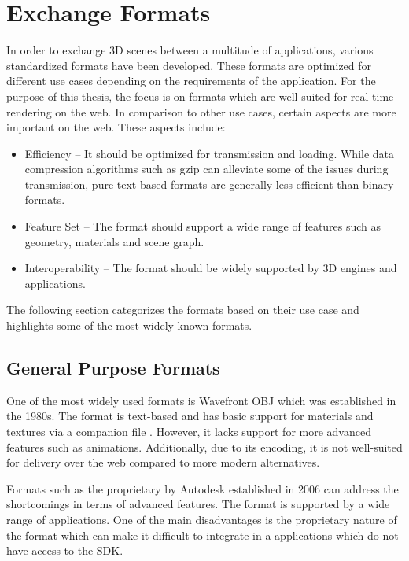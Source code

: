 \section{Exchange Formats}

In order to exchange 3D scenes between a multitude of applications, various standardized formats have been developed. These formats are optimized for different use cases depending on the requirements of the application. For the purpose of this thesis, the focus is on formats which are well-suited for real-time rendering on the web. In comparison to other use cases, certain aspects are more important on the web. These aspects include:

\begin{itemize}
    \item{Efficiency} – It should be optimized for transmission and loading. While data compression algorithms such as gzip can alleviate some of the issues during transmission, pure text-based formats are generally less efficient than binary formats.
    \item{Feature Set} – The format should support a wide range of features such as geometry, materials and scene graph.
    \item{Interoperability} – The format should be widely supported by 3D engines and applications.
\end{itemize}

The following section categorizes the formats based on their use case and highlights some of the most widely known formats.

\subsection*{General Purpose Formats}

One of the most widely used formats is Wavefront \gls{OBJ} which was established in the 1980s. The format is text-based and has basic support for materials and textures via a companion file . However, it lacks support for more advanced features such as animations. Additionally, due to its encoding, it is not well-suited for delivery over the web compared to more modern alternatives.

Formats such as the proprietary  by Autodesk established in 2006 can address the shortcomings in terms of advanced features. The format is supported by a wide range of applications. One of the main disadvantages is the proprietary nature of the format  which can make it difficult to integrate in a applications which do not have access to the SDK.


